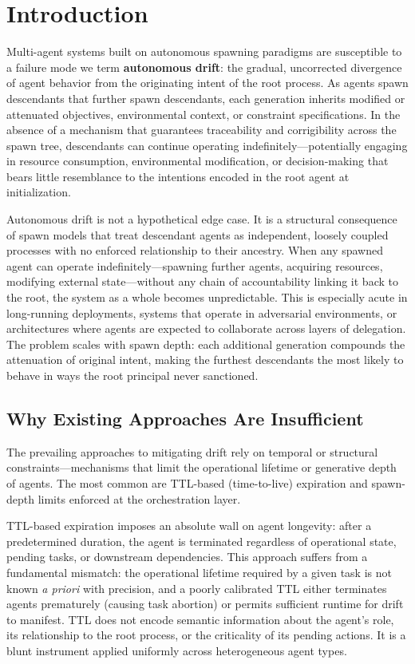 \section{Introduction}

Multi-agent systems built on autonomous spawning paradigms are susceptible to a failure mode we term \textbf{autonomous drift}: the gradual, uncorrected divergence of agent behavior from the originating intent of the root process. As agents spawn descendants that further spawn descendants, each generation inherits modified or attenuated objectives, environmental context, or constraint specifications. In the absence of a mechanism that guarantees traceability and corrigibility across the spawn tree, descendants can continue operating indefinitely—potentially engaging in resource consumption, environmental modification, or decision-making that bears little resemblance to the intentions encoded in the root agent at initialization.

Autonomous drift is not a hypothetical edge case. It is a structural consequence of spawn models that treat descendant agents as independent, loosely coupled processes with no enforced relationship to their ancestry. When any spawned agent can operate indefinitely—spawning further agents, acquiring resources, modifying external state—without any chain of accountability linking it back to the root, the system as a whole becomes unpredictable. This is especially acute in long-running deployments, systems that operate in adversarial environments, or architectures where agents are expected to collaborate across layers of delegation. The problem scales with spawn depth: each additional generation compounds the attenuation of original intent, making the furthest descendants the most likely to behave in ways the root principal never sanctioned.

\subsection{Why Existing Approaches Are Insufficient}

The prevailing approaches to mitigating drift rely on temporal or structural constraints—mechanisms that limit the operational lifetime or generative depth of agents. The most common are TTL-based (time-to-live) expiration and spawn-depth limits enforced at the orchestration layer.

TTL-based expiration imposes an absolute wall on agent longevity: after a predetermined duration, the agent is terminated regardless of operational state, pending tasks, or downstream dependencies. This approach suffers from a fundamental mismatch: the operational lifetime required by a given task is not known \textit{a priori} with precision, and a poorly calibrated TTL either terminates agents prematurely (causing task abortion) or permits sufficient runtime for drift to manifest. TTL does not encode semantic information about the agent's role, its relationship to the root process, or the criticality of its pending actions. It is a blunt instrument applied uniformly across heterogeneous agent types.

